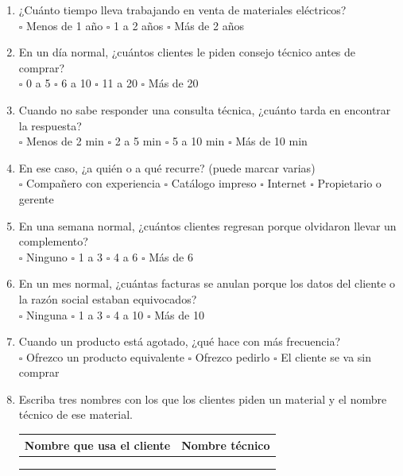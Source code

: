 \begin{enumerate}[label=A\arabic*., leftmargin=*]
\item ¿Cuánto tiempo lleva trabajando en venta de materiales eléctricos?\\
$\square$ Menos de 1 año \quad $\square$ 1 a 2 años \quad $\square$ Más de 2 años
\item En un día normal, ¿cuántos clientes le piden consejo técnico antes de comprar?\\
$\square$ 0 a 5 \quad $\square$ 6 a 10 \quad $\square$ 11 a 20 \quad $\square$ Más de 20
\item Cuando no sabe responder una consulta técnica, ¿cuánto tarda en encontrar la respuesta?\\
$\square$ Menos de 2 min \quad $\square$ 2 a 5 min \quad $\square$ 5 a 10 min \quad $\square$ Más de 10 min
\item En ese caso, ¿a quién o a qué recurre? (puede marcar varias)\\
$\square$ Compañero con experiencia \quad $\square$ Catálogo impreso \quad $\square$ Internet \quad $\square$ Propietario o gerente
\item En una semana normal, ¿cuántos clientes regresan porque olvidaron llevar un complemento?\\
$\square$ Ninguno \quad $\square$ 1 a 3 \quad $\square$ 4 a 6 \quad $\square$ Más de 6
\item En un mes normal, ¿cuántas facturas se anulan porque los datos del cliente o la razón social estaban equivocados?\\
$\square$ Ninguna \quad $\square$ 1 a 3 \quad $\square$ 4 a 10 \quad $\square$ Más de 10
\item Cuando un producto está agotado, ¿qué hace con más frecuencia?\\
$\square$ Ofrezco un producto equivalente \quad $\square$ Ofrezco pedirlo \quad $\square$ El cliente se va sin comprar
\item Escriba tres nombres con los que los clientes piden un material y el nombre técnico de ese material.\\[0.3em]
\begin{tabular}{@{}p{6cm}p{6cm}@{}}
Nombre que usa el cliente & Nombre técnico \\
\hline
\rule{0pt}{1.2em} & \\
\hline
\rule{0pt}{1.2em} & \\
\hline
\rule{0pt}{1.2em} & \\
\hline
\end{tabular}
\end{enumerate}

